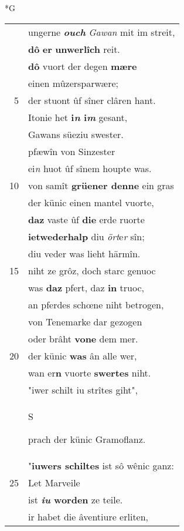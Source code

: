 \documentclass[8pt,a4paper,notitlepage]{article}
\begin{document}
\newpage
\begin{table}[ht]
\begin{minipage}[t]{0.5\linewidth}
\small
\begin{center}*G
\end{center}
\begin{tabular}{rl}
 & ungerne \textit{\textbf{ouch}} \textit{Gawan} mit im streit,\\ 
 & \textbf{dô} \textbf{er} \textbf{unwerlîch} reit.\\ 
 & \textbf{dô} vuort der degen \textbf{mære}\\ 
 & einen mûzersparwære;\\ 
5 & der stuont ûf sîner clâren hant.\\ 
 & Itonie het \textbf{i\textit{n} i\textit{m}} gesant,\\ 
 & Gawans süeziu swester.\\ 
 & pfæwîn von Sinzester\\ 
 & ei\textit{n} huot ûf sînem houpte was.\\ 
10 & von samît \textbf{grüener denne} ein gras\\ 
 & der künic einen mantel vuorte,\\ 
 & \textbf{daz} vaste ûf \textbf{die} erde ruorte\\ 
 & \textbf{ietwederhalp} diu \textit{ört}e\textit{r} sîn;\\ 
 & diu veder was lieht härmîn.\\ 
15 & niht ze grôz, doch starc genuoc\\ 
 & was \textbf{daz} pfert, daz \textbf{in} truoc,\\ 
 & an pferdes schœne niht betrogen,\\ 
 & von Tenemarke dar gezogen\\ 
 & oder brâht \textbf{vone} dem mer.\\ 
20 & der künic \textbf{was} ân alle wer,\\ 
 & wan er\textbf{n} vuorte \textbf{swertes} niht.\\ 
 & "iwer schilt iu strîtes giht",\\ 
 & \begin{large}S\end{large}prach der künic Gramoflanz.\\ 
 & "\textbf{iuwers schiltes} ist sô wênic ganz:\\ 
25 & Let Marveile\\ 
 & ist \textbf{\textit{iu} worden} ze teile.\\ 
 & ir habet die âventiure erliten,\\ 

\end{tabular}
\end{minipage}
\end{table}
\end{document}

